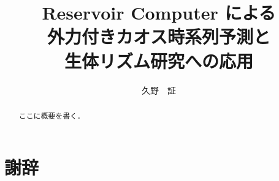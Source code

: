 \documentclass[uplatex]{suribt}
\title{Reservoir Computer による\\外力付きカオス時系列予測と\\生体リズム研究への応用}
\author{久野　証}
\begin{document}
\maketitle%

\frontmatter%
\begin{abstract}%
 ここに概要を書く．
\end{abstract}

\tableofcontents%

\mainmatter%










\cite{RODRIGUES20161}

\backmatter%
\chapter{謝辞}%



\end{document}
